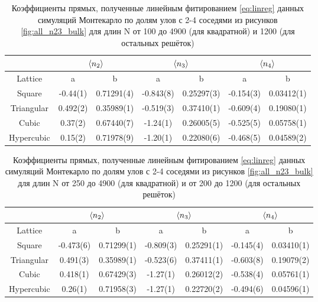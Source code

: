 \begin{table}[h]
    \centering
    \begin{tabular}{|c|c|c|c|c|c|c|} \hline
         & \multicolumn{2}{|c|}{$\langle n_{2} \rangle$} & \multicolumn{2}{|c|}{$\langle n_{3} \rangle$} & \multicolumn{2}{|c|}{$\langle n_{4} \rangle$}\\ \hline
         Lattice & a & b & a & b  & a & b  \\ \hline
        Square & -0.44(1) & 0.71291(4) & -0.843(8) & 0.25297(3) &  -0.154(3) & 0.03412(1)  \\ \hline
        Triangular & 0.492(2) & 0.35989(1) & -0.519(3) & 0.37410(1) & -0.609(4) & 0.19080(1)  \\ \hline
        Cubic & 0.37(2) & 0.67440(7) &  -1.24(1) & 0.26005(5) & -0.525(5) & 0.05758(1) \\ \hline
        Hypercubic & 0.15(2) & 0.71978(9) & -1.20(1) & 0.22080(6) & -0.468(5) & 0.04589(2)\\ \hline
    \end{tabular}
    \caption{Коэффициенты прямых, полученные линейным фитированием \eqref{eq:linreg} данных симуляций Монтекарло по долям улов с 2-4 соседями из рисунков \ref{fig:all_n23_bulk} для длин N от 100 до 4900 (для квадратной) и 1200 (для остальных решёток)}
    \label{tab:n24_fit_coeff_100}
\end{table}

\begin{table}[h]
    \centering
    \begin{tabular}{|c|c|c|c|c|c|c|} \hline
         & \multicolumn{2}{|c|}{$\langle n_{2} \rangle$} & \multicolumn{2}{|c|}{$\langle n_{3} \rangle$} & \multicolumn{2}{|c|}{$\langle n_{4} \rangle$}\\ \hline
         Lattice & a & b & a & b  & a & b  \\ \hline
        Square & -0.473(6) & 0.71299(1) & -0.809(3) & 0.25291(1) &  -0.145(4) & 0.03410(1)  \\ \hline
        Triangular & 0.491(3) & 0.35989(1) & -0.523(6) & 0.37411(1) & -0.603(8) & 0.19079(2)  \\ \hline
        Cubic & 0.418(1) & 0.67429(3) &  -1.27(1) & 0.26012(2) & -0.538(4) & 0.05761(1) \\ \hline
        Hypercubic & 0.26(1) & 0.71958(3) & -1.27(1) & 0.22720(2) & -0.494(6) & 0.04596(1)\\ \hline
    \end{tabular}
    \caption{Коэффициенты прямых, полученные линейным фитированием \eqref{eq:linreg} данных симуляций Монтекарло по долям улов с 2-4 соседями из рисунков \ref{fig:all_n23_bulk} для длин N от 250 до 4900 (для квадратной) и от 200 до 1200 (для остальных решёток)}
    \label{tab:n24_fit_coeff_200}
\end{table}

